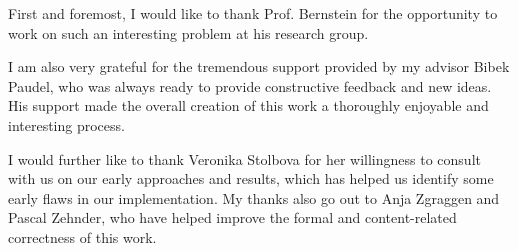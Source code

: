 \begin{acknowledgements}
First and foremost, I would like to thank Prof. Bernstein for the opportunity to work on such an interesting problem at his research group.

I am also very grateful for the tremendous support provided by my advisor Bibek Paudel, who was always ready to provide constructive feedback and new ideas. His support made the overall creation of this work a thoroughly enjoyable and interesting process.

I would further like to thank Veronika Stolbova for her willingness to consult with us on our early approaches and results, which has helped us identify some early flaws in our implementation. My thanks also go out to Anja Zgraggen and Pascal Zehnder, who have helped improve the formal and content-related correctness of this work.
\end{acknowledgements}
